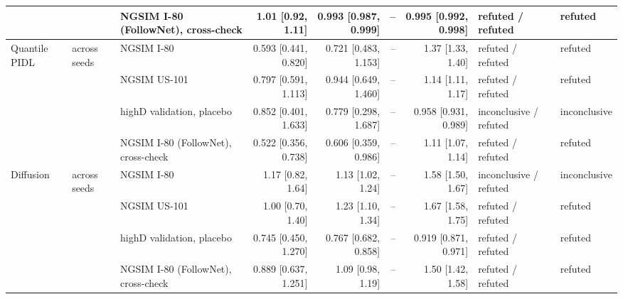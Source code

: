 \begin{longtable}{lllrrrrll}
 &  & NGSIM I-80 (FollowNet), cross-check & 1.01 [0.92, 1.11] & 0.993 [0.987, 0.999] & -- & 0.995 [0.992, 0.998] & refuted / refuted & refuted \\
\midrule
Quantile PIDL & across seeds & NGSIM I-80 & 0.593 [0.441, 0.820] & 0.721 [0.483, 1.153] & -- & 1.37 [1.33, 1.40] & refuted / refuted & refuted \\
 &  & NGSIM US-101 & 0.797 [0.591, 1.113] & 0.944 [0.649, 1.460] & -- & 1.14 [1.11, 1.17] & refuted / refuted & refuted \\
 &  & highD validation, placebo & 0.852 [0.401, 1.633] & 0.779 [0.298, 1.687] & -- & 0.958 [0.931, 0.989] & inconclusive / refuted & inconclusive \\
 &  & NGSIM I-80 (FollowNet), cross-check & 0.522 [0.356, 0.738] & 0.606 [0.359, 0.986] & -- & 1.11 [1.07, 1.14] & refuted / refuted & refuted \\
\midrule
Diffusion & across seeds & NGSIM I-80 & 1.17 [0.82, 1.64] & 1.13 [1.02, 1.24] & -- & 1.58 [1.50, 1.67] & inconclusive / refuted & inconclusive \\
 &  & NGSIM US-101 & 1.00 [0.70, 1.40] & 1.23 [1.10, 1.34] & -- & 1.67 [1.58, 1.75] & refuted / refuted & refuted \\
 &  & highD validation, placebo & 0.745 [0.450, 1.270] & 0.767 [0.682, 0.858] & -- & 0.919 [0.871, 0.971] & refuted / refuted & refuted \\
 &  & NGSIM I-80 (FollowNet), cross-check & 0.889 [0.637, 1.251] & 1.09 [0.98, 1.19] & -- & 1.50 [1.42, 1.58] & refuted / refuted & refuted \\
\end{longtable}
\endgroup
